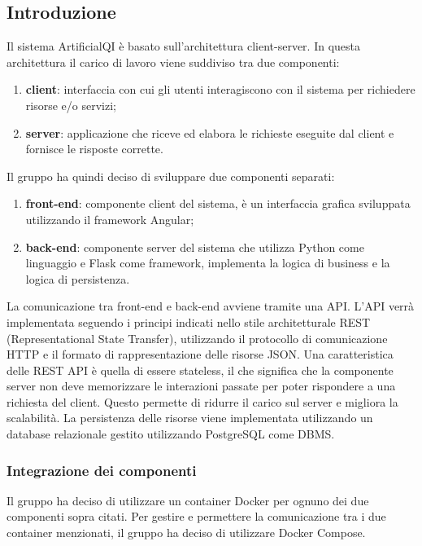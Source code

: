 \subsection{Introduzione}
\label{subsec:introduzione}

Il sistema ArtificialQI è basato sull'architettura client-server.
In questa architettura il carico di lavoro viene suddiviso tra due componenti:
\begin{enumerate}
    \item \textbf{client}: interfaccia con cui gli utenti interagiscono con il sistema per richiedere risorse e/o servizi;
    \item \textbf{server}: applicazione che riceve ed elabora le richieste eseguite dal client e fornisce le risposte corrette. 
\end{enumerate}
Il gruppo ha quindi deciso di sviluppare due componenti separati:
\begin{enumerate}
    \item \textbf{front-end}: componente client del sistema, è un interfaccia grafica sviluppata utilizzando il framework Angular;  
    \item \textbf{back-end}: componente server del sistema che utilizza Python come linguaggio e Flask come framework, implementa la logica di business e la logica di persistenza.
\end{enumerate}
La comunicazione tra front-end e back-end avviene tramite una API.
L'API verrà implementata seguendo i principi indicati nello stile architetturale REST (Representational State Transfer), utilizzando il protocollo di comunicazione HTTP e il formato di rappresentazione delle risorse JSON.
Una caratteristica delle REST API è quella di essere stateless, il che significa che la componente server non deve memorizzare le interazioni passate per poter rispondere a una richiesta del client. 
Questo permette di ridurre il carico sul server e migliora la scalabilità.
La persistenza delle risorse viene implementata utilizzando un database relazionale gestito utilizzando PostgreSQL come DBMS.

\subsubsection{Integrazione dei componenti}
Il gruppo ha deciso di utilizzare un container Docker per ognuno dei due componenti sopra citati.
Per gestire e permettere la comunicazione tra i due container menzionati, il gruppo ha deciso di utilizzare Docker Compose.  
